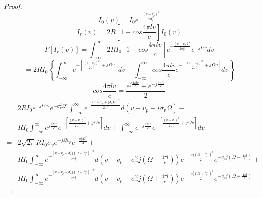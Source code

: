 \begin{proof}
\begin{equation}
I_{0}(v)=I_{0}e^{-\frac{(v-v_{p})^{2}}{2\sigma_{v}^{2}}}
\end{equation}
\begin{equation}
I_{r}(v)=2R\left[1-cos\frac{4\pi lv}{c}\right]I_{0}(v)
\end{equation}
\begin{equation}
F\left[I_{r}(v)\right]=\int_{-\infty}^{\infty}2RI_{0}\left[1-cos\frac{4\pi lv}{c}\right]e^{-\frac{(v-v_{p})^{2}}{2\sigma_{v}^{2}}}e^{-j\Omega v}dv
\end{equation}
\begin{equation}
=2RI_{0}\left\{\int_{-\infty}^{\infty}e^{-\left[\frac{(v-v_{p})^{2}}{2\sigma_{v}^{2}}+j\Omega v \right]}dv-\int_{-\infty}^{\infty}cos\frac{4\pi lv}{c}e^{-\left[\frac{(v-v_{p})^{2}}{2\sigma_{v}^{2}}+j\Omega v \right]}dv \right\}
\end{equation}
\begin{equation}
cos\frac{4\pi lv}{c}=\frac{e^{j\frac{4\pi lv}{c}}+e^{-j\frac{4\pi lv}{c}}}{2}
\end{equation}
\begin{equation}
\begin{aligned}
=&2RI_{0}e^{-j\Omega v_{p}}e^{-\sigma_{v}^{2}\Omega^{2}} \int_{-\infty}^{\infty}e^{-\frac{(v-v_{p}+j\sigma_{v}\Omega)^{2}}{2\sigma_{v}^{2}}}d(v-v_{p}+i\sigma_{v}\Omega)-\\
&RI_{0}\int_{-\infty}^{\infty}e^{j\frac{4\pi lv}{c}}e^{-\left[\frac{(v-v_{p})^{2}}{2\sigma_{v}^{2}}+j\Omega v \right]}dv+\int_{-\infty}^{\infty}e^{-j\frac{4\pi lv}{c}}e^{-\left[\frac{(v-v_{p})^{2}}{2\sigma_{v}^{2}}+j\Omega v \right]}dv\\
=&2\sqrt{2\pi}RI_{0}\sigma_{v}e^{-j\Omega v_{p}}e^{-\frac{\sigma_{v}^{2}\Omega^{2}}{2}}+\\
&RI_{0}\int_{-\infty}^{\infty}e^{-\frac{\left[v-v_{p}+\sigma_{v}^{2}j(\Omega-\frac{4\pi l}{c}) \right]^{2}}{2\sigma_{v}^{2}}}d(v-v_{p}+\sigma_{v}^{2}j(\Omega-\frac{4\pi l}{c}))e^{-\frac{-\sigma_{v}^{2}(\Omega-\frac{4\pi l}{c})^{2}}{2}}e^{-v_{p}j(\Omega-\frac{4\pi l}{c})}+\\
&RI_{0}\int_{-\infty}^{\infty}e^{-\frac{\left[v-v_{p}+\sigma_{v}^{2}j(\Omega+\frac{4\pi l}{c}) \right]^{2}}{2\sigma_{v}^{2}}}d(v-v_{p}+\sigma_{v}^{2}j(\Omega+\frac{4\pi l}{c}))e^{-\frac{-\sigma_{v}^{2}(\Omega+\frac{4\pi l}{c})^{2}}{2}}e^{-v_{p}j(\Omega+\frac{4\pi l}{c})}
\end{aligned}
\end{equation}

\end{proof}
